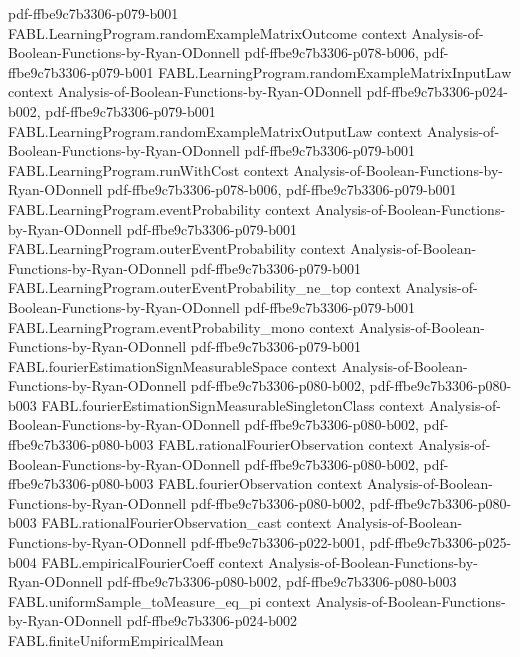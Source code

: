\begin{theorem}
  {pdf-ffbe9c7b3306-p079-b001}
\proofstep
  {FABL.LearningProgram.randomExampleMatrixOutcome}
  {context}
  {Analysis-of-Boolean-Functions-by-Ryan-ODonnell}
  {pdf-ffbe9c7b3306-p078-b006,
    pdf-ffbe9c7b3306-p079-b001}
\proofstep
  {FABL.LearningProgram.randomExampleMatrixInputLaw}
  {context}
  {Analysis-of-Boolean-Functions-by-Ryan-ODonnell}
  {pdf-ffbe9c7b3306-p024-b002,
    pdf-ffbe9c7b3306-p079-b001}
\proofstep
  {FABL.LearningProgram.randomExampleMatrixOutputLaw}
  {context}
  {Analysis-of-Boolean-Functions-by-Ryan-ODonnell}
  {pdf-ffbe9c7b3306-p079-b001}
\proofstep
  {FABL.LearningProgram.runWithCost}
  {context}
  {Analysis-of-Boolean-Functions-by-Ryan-ODonnell}
  {pdf-ffbe9c7b3306-p078-b006,
    pdf-ffbe9c7b3306-p079-b001}
\proofstep
  {FABL.LearningProgram.eventProbability}
  {context}
  {Analysis-of-Boolean-Functions-by-Ryan-ODonnell}
  {pdf-ffbe9c7b3306-p079-b001}
\proofstep
  {FABL.LearningProgram.outerEventProbability}
  {context}
  {Analysis-of-Boolean-Functions-by-Ryan-ODonnell}
  {pdf-ffbe9c7b3306-p079-b001}
\proofstep
  {FABL.LearningProgram.outerEventProbability_ne_top}
  {context}
  {Analysis-of-Boolean-Functions-by-Ryan-ODonnell}
  {pdf-ffbe9c7b3306-p079-b001}
\proofstep
  {FABL.LearningProgram.eventProbability_mono}
  {context}
  {Analysis-of-Boolean-Functions-by-Ryan-ODonnell}
  {pdf-ffbe9c7b3306-p079-b001}
\proofstep
  {FABL.fourierEstimationSignMeasurableSpace}
  {context}
  {Analysis-of-Boolean-Functions-by-Ryan-ODonnell}
  {pdf-ffbe9c7b3306-p080-b002,
    pdf-ffbe9c7b3306-p080-b003}
\proofstep
  {FABL.fourierEstimationSignMeasurableSingletonClass}
  {context}
  {Analysis-of-Boolean-Functions-by-Ryan-ODonnell}
  {pdf-ffbe9c7b3306-p080-b002,
    pdf-ffbe9c7b3306-p080-b003}
\proofstep
  {FABL.rationalFourierObservation}
  {context}
  {Analysis-of-Boolean-Functions-by-Ryan-ODonnell}
  {pdf-ffbe9c7b3306-p080-b002,
    pdf-ffbe9c7b3306-p080-b003}
\proofstep
  {FABL.fourierObservation}
  {context}
  {Analysis-of-Boolean-Functions-by-Ryan-ODonnell}
  {pdf-ffbe9c7b3306-p080-b002,
    pdf-ffbe9c7b3306-p080-b003}
\proofstep
  {FABL.rationalFourierObservation_cast}
  {context}
  {Analysis-of-Boolean-Functions-by-Ryan-ODonnell}
  {pdf-ffbe9c7b3306-p022-b001,
    pdf-ffbe9c7b3306-p025-b004}
\proofstep
  {FABL.empiricalFourierCoeff}
  {context}
  {Analysis-of-Boolean-Functions-by-Ryan-ODonnell}
  {pdf-ffbe9c7b3306-p080-b002,
    pdf-ffbe9c7b3306-p080-b003}
\proofstep
  {FABL.uniformSample_toMeasure_eq_pi}
  {context}
  {Analysis-of-Boolean-Functions-by-Ryan-ODonnell}
  {pdf-ffbe9c7b3306-p024-b002}
\proofstep
  {FABL.finiteUniformEmpiricalMean}

\end{theorem}

